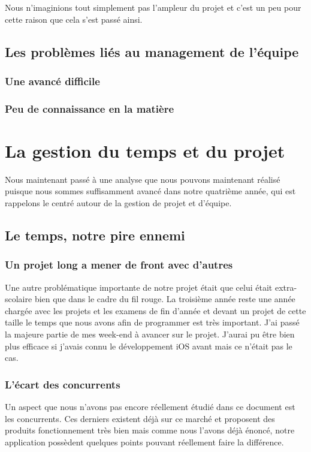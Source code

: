 \documentclass{article}
\begin{document}
		Nous n'imaginions tout simplement pas l'ampleur du projet et c'est un peu pour cette raison que cela s'est passé ainsi.
\subsection{Les problèmes liés au management de l'équipe}
\subsubsection{Une avancé difficile}
\subsubsection{Peu de connaissance en la matière}


\section{La gestion du temps et du projet}
		Nous maintenant passé à une analyse que nous pouvons maintenant réalisé puisque nous sommes suffisamment avancé dans notre quatrième année, qui est rappelons le centré autour de la gestion de projet et d'équipe.
		
\subsection{Le temps, notre pire ennemi}
\subsubsection{Un projet long a mener de front avec d'autres}
		Une autre problématique importante de notre projet était que celui était extra-scolaire bien que dans le cadre du fil rouge. La troisième année reste une année chargée avec les projets et les examens de fin d'année et devant un projet de cette taille le temps que nous avons afin de programmer est très important. J'ai passé la majeure partie de mes week-end à avancer sur le projet. J'aurai pu être bien plus efficace si j'avais connu le développement iOS avant mais ce n'était pas le cas.

\subsubsection{L'écart des concurrents}
		Un aspect que nous n'avons pas encore réellement étudié dans ce document est les concurrents. Ces derniers existent déjà sur ce marché et proposent des produits fonctionnement très bien mais comme nous l'avons déjà énoncé, notre application possèdent quelques points pouvant réellement faire la différence.\\
		
\end{document}
